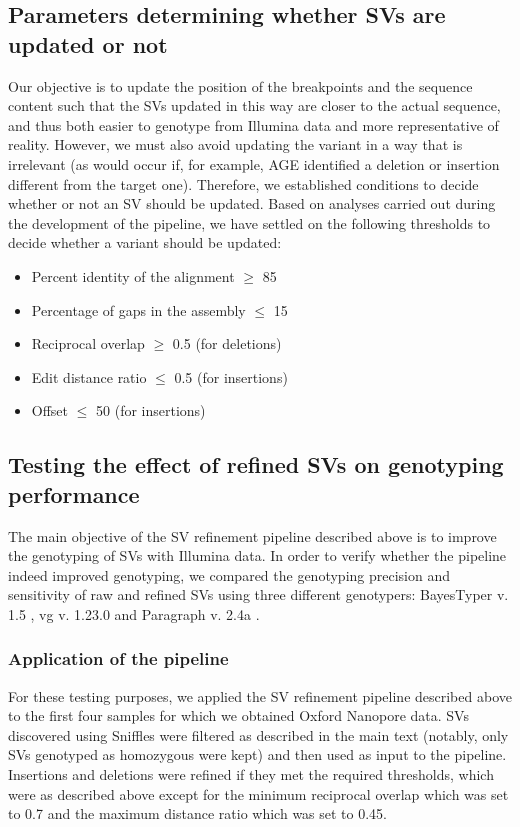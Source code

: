 \documentclass[12pt]{article}
\begin{document}
\subsection{Parameters determining whether SVs are updated or not}

Our objective is to update the position of the breakpoints and the sequence content such that the SVs updated in this way are closer to the actual sequence, and thus both easier to genotype from Illumina data and more representative of reality.
However, we must also avoid updating the variant in a way that is irrelevant (as would occur if, for example, AGE identified a deletion or insertion different from the target one).
Therefore, we established conditions to decide whether or not an SV should be updated.
Based on analyses carried out during the development of the pipeline, we have settled on the following thresholds to decide whether a variant should be updated:

\begin{itemize}
\item Percent identity of the alignment $\geq$ 85
\item Percentage of gaps in the assembly $\leq$ 15
\item Reciprocal overlap $\geq$ 0.5 (for deletions)
\item Edit distance ratio $\leq$ 0.5 (for insertions)
\item Offset $\leq$ 50 (for insertions)
\end{itemize}

\subsection{Testing the effect of refined SVs on genotyping performance}

The main objective of the SV refinement pipeline described above is to improve the genotyping of SVs with Illumina data.
In order to verify whether the pipeline indeed improved genotyping, we compared the genotyping precision and sensitivity of raw and refined SVs using three different genotypers: BayesTyper v. 1.5 \citep{bayestyper}, vg v. 1.23.0 \citep{vg} and Paragraph v. 2.4a \citep{paragraph}.

\subsubsection{Application of the pipeline}

For these testing purposes, we applied the SV refinement pipeline described above to the first four samples for which we obtained Oxford Nanopore data.
SVs discovered using Sniffles were filtered as described in the main text (notably, only SVs genotyped as homozygous were kept) and then used as input to the pipeline.
Insertions and deletions were refined if they met the required thresholds, which were as described above except for the minimum reciprocal overlap which was set to 0.7 and the maximum distance ratio which was set to 0.45.
\end{document}
